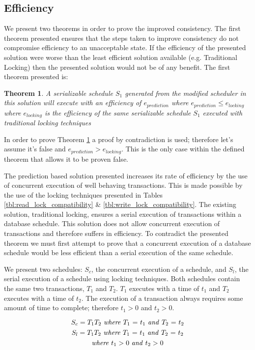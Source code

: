 \documentclass[conference]{IEEEtran}
\newtheorem{theorem}{Theorem}
\begin{document}
\subsection{Efficiency}
We present two theorems in order to prove the improved consistency. The first theorem presented ensures that the steps taken to improve consistency do not compromise efficiency to an unacceptable state. If the efficiency of the presented solution were worse than the least efficient solution available (e.g. Traditional Locking) then the presented solution would not be of any benefit. The first theorem presented is:

\begin{theorem}
\label{theorem1}
  A serializable schedule $S_{1}$ generated from the modified scheduler in this solution will execute with an efficiency of $e_{prediction}$ where $e_{prediction} \le e_{locking}$ where $e_{locking}$ is the efficiency of the same serializable schedule $S_{1}$ executed with traditional locking techniques 
\end{theorem}

In order to prove Theorem \ref{theorem1} a proof by contradiction is used; therefore let's assume it's false and $e_{prediction} > e_{locking}$. This is the only case within the defined theorem that allows it to be proven false. 

The prediction based solution presented increases its rate of efficiency by the use of concurrent execution of well behaving transactions. This is made possible by the use of the locking techniques presented in Tables \ref{tbl:read_lock_compatibility} \& \ref{tbl:write_lock_compatibility}. The existing solution, traditional locking, ensures a serial execution of transactions within a database schedule. This solution does not allow concurrent execution of transactions and therefore suffers in efficiency. To contradict the presented theorem we must first attempt to prove that a concurrent execution of a database schedule would be less efficient than a serial execution of the same schedule.

We present two schedules: $S_{c}$, the concurrent execution of a schedule, and $S_{l}$, the serial execution of a schedule using locking techniques. Both schedules contain the same two transactions, $T_{1}$ and $T_{2}$. $T_{1}$ executes with a time of $t_{1}$ and $T_{2}$ executes with a time of $t_{2}$. The execution of a transaction always requires some amount of time to complete; therefore $t_{1} > 0$ and $t_{2} > 0$. 

\[ \textrm{$S_{c} = T_{1}T_{2}$ \textit{where} $T_{1}$ = $t_{1}$ \textit{and} $T_{2}$ = $t_{2}$} \]
\[ \textrm{$S_{l} = T_{1}T_{2}$ \textit{where} $T_{1}$ = $t_{1}$ \textit{and} $T_{2}$ = $t_{2}$} \]
\[ \textrm{\textit{where} $t_{1} > 0$ \textit{and} $t_{2} > 0$}\]
\end{document}
